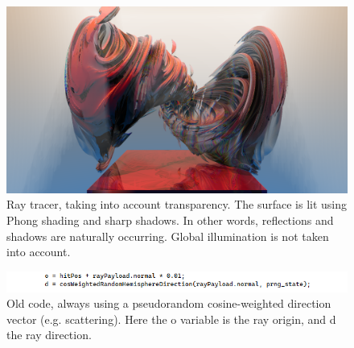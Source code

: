 \documentclass[12pt]{article}
\begin{document}
\begin{figure} 
\centering
  \includegraphics[width = 6 in]{v_rt_reflect.png}
  \caption{ Ray tracer, taking into account transparency.
The surface is lit using Phong shading and sharp shadows.
In other words, reflections and shadows are naturally occurring.
Global illumination is not taken into account.
}
\end{figure}


\pagebreak


\begin{figure} 
\centering
  \includegraphics[width = 6 in]{old_code.png}
  \caption{ Old code, always using a pseudorandom cosine-weighted direction vector (e.g. scattering).
Here the o variable is the ray origin, and d the ray direction.
}
\end{figure}


\pagebreak
\end{document}
